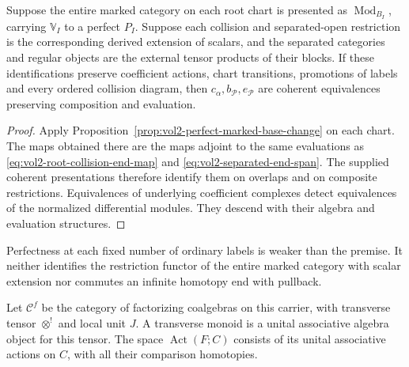 \begin{proposition}\label{prop:vol2-perfect-collision-criterion}
Suppose the entire marked category on each root chart is
presented as \(\operatorname{Mod}_{B_I}\), carrying
\(\mathbb V_I\) to a perfect \(P_I\). Suppose each collision
and separated-open restriction is the corresponding derived
extension of scalars, and the separated categories and regular
objects are the external tensor products of their blocks.
If these identifications preserve coefficient actions,
chart transitions, promotions of labels and every ordered
collision diagram, then \(c_\alpha,b_{\mathcal P},e_{\mathcal P}\)
are coherent equivalences preserving composition and evaluation.
\end{proposition}
\begin{proof}
Apply Proposition~\ref{prop:vol2-perfect-marked-base-change}
on each chart. The maps obtained there are the maps adjoint
to the same evaluations as
\eqref{eq:vol2-root-collision-end-map} and
\eqref{eq:vol2-separated-end-span}. The supplied coherent
presentations therefore identify them on overlaps and on
composite restrictions. Equivalences of underlying
coefficient complexes detect equivalences of the normalized
differential modules. They descend with their algebra and
evaluation structures.
\end{proof}

Perfectness at each fixed number of ordinary labels is
weaker than the premise. It neither identifies the restriction
functor of the entire marked category with scalar extension
nor commutes an infinite homotopy end with pullback.

Let \(\mathcal C^f\) be the category of factorizing coalgebras
on this carrier, with transverse tensor \(\otimes^!\)
and local unit \(J\). A transverse monoid is a unital
associative algebra object for this tensor.
The space \(\operatorname{Act}(F;C)\) consists of its
unital associative actions on \(C\), with all their
comparison homotopies.

